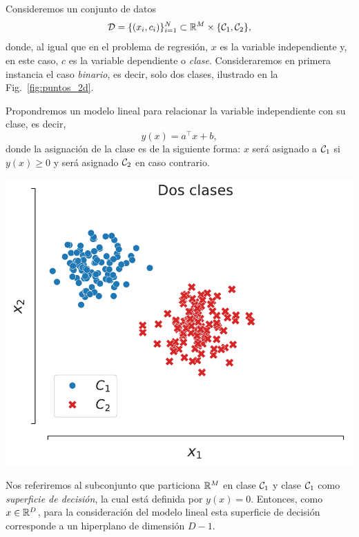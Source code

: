 \noindent\begin{minipage}{0.52\textwidth}
	Consideremos un conjunto de datos
	\begin{equation}
	 	{\mathcal D} = \{(x_i,c_i)\}_{i=1}^N\subset{\mathbb R}^M\times\{{\mathcal C}_1,{\mathcal C}_2\},
	 \end{equation}
	 donde, al igual que en el problema de regresión, $x$ es la variable independiente y, en este caso, $c$ es la variable dependiente o \emph{clase}. Consideraremos en primera instancia el  caso \emph{binario}, es decir, solo dos clases, ilustrado en la Fig.~\ref{fig:puntos_2d}. 

	 Propondremos un modelo lineal para relacionar la variable independiente con su clase, es decir, 
	\begin{equation}
		y(x) = a^\top  x + b,
		\label{eq:clasificacion_lineal}
	\end{equation}
	donde la  asignación de la clase es de la siguiente forma: $x$ será asignado a ${\mathcal C}_1$ si $y(x) \geq 0$ y será asignado ${\mathcal C}_2$ en caso contrario.
\end{minipage}\hfill
\begin{minipage}{0.46\textwidth}
	\centering
	\includegraphics[width=\textwidth]{img/cap2_dosclases}\\
	\label{fig:puntos_2d}
\end{minipage}

\vspace{1cm}
Nos referiremos al subconjunto que particiona ${\mathbb R}^M$ en clase ${\mathcal C}_1$ y clase ${\mathcal C}_1$ como \emph{superficie de decisión}, la cual está definida por $y(x)=0$. Entonces, como $x\in{\mathbb R}^D$, para la consideración del modelo lineal esta superficie de decisión corresponde a un hiperplano de dimensión $D-1$.

